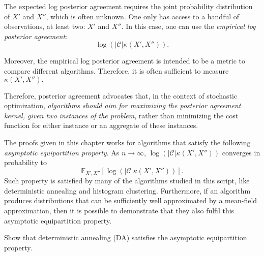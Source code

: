 The expected log posterior agreement requires the joint probability distribution of $X'$ and $X''$, which is often unknown. One only has access to a handful of observations, at least two: $X'$ and $X''$. In this case, one can use the \emph{empirical log posterior agreement}:
%
\begin{equation}
\log \left(\left|\mathcal{C}\right|\kappa\left(X', X''\right)\right).
\label{eq:overview_emp_log_post_agr}
\end{equation}

Moreover, the empirical log posterior agreement is intended to be a metric to compare different algorithms. Therefore, it is often sufficient to measure $\kappa\left(X', X''\right).$


Therefore, posterior agreement advocates that, in the context of stochastic optimization, \emph{algorithms should aim for maximizing the posterior agreement kernel, given two instances of the problem}, rather than minimizing the cost function for either instance or an aggregate of these instances.

The proofs given in this chapter works for algorithms that satisfy the following \emph{asymptotic equipartition property}. As $n \to \infty$, $\log \left(\left|\mathcal{C}\right|\kappa(X', X'')\right)$ converges in probability to
%
\begin{equation}
\mathbb{E}_{X', X''}\left[\log \left(\left|\mathcal{C}\right|\kappa(X', X'')\right)\right].
\end{equation}
%
Such property is satisfied by many of the algorithms studied in this script, like deterministic annealing and histogram clustering. Furthermore, if an algorithm produces distributions that can be sufficiently well approximated by a mean-field approximation, then it is possible to demonstrate that they also fulfil this asymptotic equipartition property.

\begin{exercise}
Show that deterministic annealing (DA) satisfies the asymptotic equipartition property.
\end{exercise}

